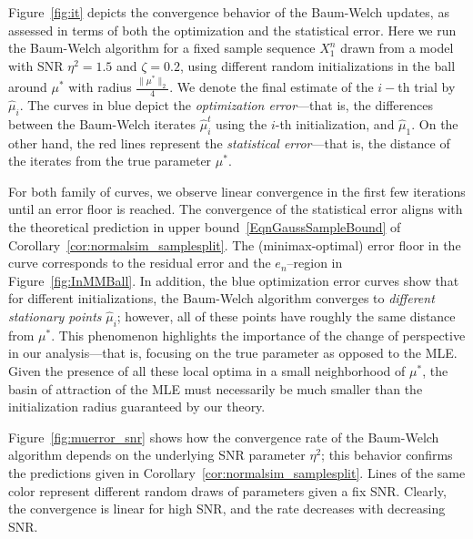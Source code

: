 \documentclass[twoside,11pt]{article}
\newcommand{\numobs}{\ensuremath{n}}
\newcommand{\norm}[1]{\ensuremath{\|#1\|_2}}
\newcommand{\paramobs}{\mu}
\newcommand{\trueparamobs}{\ensuremath{\paramobs^*}}
\newcommand{\SNR}{\eta^2}
\newcommand{\paramobshat}{\widehat{\paramobs}}
\newcommand{\minimaxrad}{\ensuremath{e_\numobs}}
\begin{document}
Figure~\ref{fig:it} depicts the convergence behavior of the Baum-Welch
updates, as assessed in terms of both the optimization and the
statistical error. Here we run the Baum-Welch algorithm for a fixed
sample sequence $X_1^n$ drawn from a model with SNR $\SNR = 1.5$ and
$\zeta = 0.2$, using different random initializations in the ball
around $\trueparamobs$ with radius $\frac{\norm{\trueparamobs}}{4}$.
We denote the final estimate of the $i-$th trial by
$\paramobshat_i$. The curves in blue depict the
\emph{optimization error}---that is, the differences between the
Baum-Welch iterates $\paramobshat_i^t$ using the $i$-th
initialization, and $\paramobshat_1$.  On the other hand, the
red lines represent the \emph{statistical error}---that is, the
distance of the iterates from the true parameter $\trueparamobs$.

For both family of curves, we observe linear convergence in the first
few iterations until an error floor is reached.  The convergence of
the statistical error aligns with the theoretical prediction in upper
bound~\eqref{EqnGaussSampleBound} of
Corollary~\ref{cor:normalsim_samplesplit}. The (minimax-optimal) error
floor in the curve corresponds to the residual error and the
$\minimaxrad$--region in Figure~\ref{fig:InMMBall}.  In addition, the
blue optimization error curves show that for different
initializations, the Baum-Welch algorithm converges to \emph{different
  stationary points} $\paramobshat_i$; however, all of these points
have roughly the same distance from $\trueparamobs$.  This phenomenon
highlights the importance of the change of perspective in our
analysis---that is, focusing on the true parameter as opposed to the
MLE.  Given the presence of all these local optima in a small
neighborhood of $\trueparamobs$, the basin of attraction of the MLE must
necessarily be much smaller than the initialization radius guaranteed
by our theory.


Figure~\ref{fig:muerror_snr} shows how the convergence rate of the
Baum-Welch algorithm depends on the underlying SNR parameter $\SNR$;
this behavior confirms the predictions given in
Corollary~\ref{cor:normalsim_samplesplit}.  Lines of the same color
represent different random draws of parameters given a fix
SNR. Clearly, the convergence is linear for high SNR, and the rate
decreases with decreasing SNR.  
\end{document}
